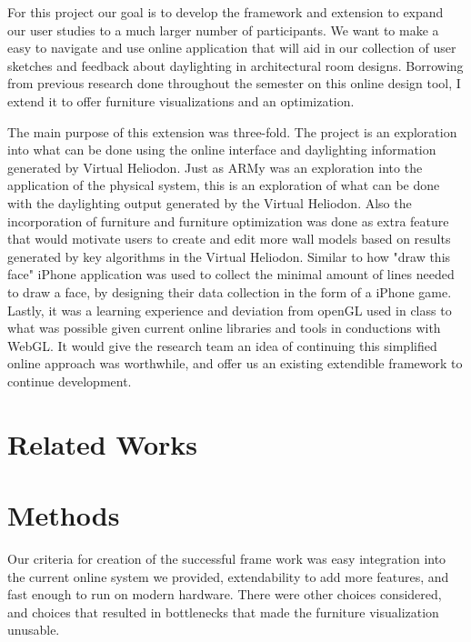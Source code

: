 \documentclass[twoside]{article}
\begin{document}
\begin{multicols}{2}
For this project our goal is to develop the framework and extension to expand our user studies to a much
larger number of participants.
%
We want to make a easy to navigate and use online application that will aid in our collection of user sketches
and feedback about daylighting in architectural room designs.
%
Borrowing from previous research done throughout the semester on this online design tool, I extend it to
offer furniture visualizations and an optimization.

The main purpose of this extension was three-fold.  The project is an exploration into what can be done using
the online interface and daylighting information generated by Virtual Heliodon. 
Just as ARMy was an exploration into the application of the physical system, this is an exploration of what can be done
with the daylighting output generated by the Virtual Heliodon.
Also the incorporation of furniture and furniture optimization was done as extra feature that would motivate
users to create and edit more wall models based on results generated by key algorithms in the Virtual Heliodon.
Similar to how "draw this face" iPhone application was used to collect the minimal amount of lines needed to draw
a face, by designing their data collection in the form of a iPhone game.
Lastly, it was a learning experience and deviation from openGL used in class to what was possible given current online libraries and tools
in conductions with WebGL. It would give the research team an idea of continuing this simplified online approach was worthwhile,
and offer us an existing extendible framework to continue development.

\section{Related Works}


\section{Methods}
Our criteria for creation of the successful frame work was easy integration into the current online system we provided,
extendability to add more features, and fast enough to run on modern hardware. There were other choices considered, and 
choices that resulted in bottlenecks that made the furniture visualization unusable.


\end{multicols}
\end{document}
